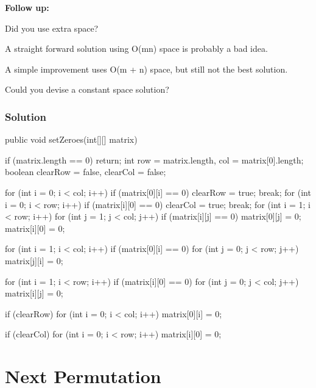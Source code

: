 \textbf{Follow up:}

Did you use extra space?

A straight forward solution using O(mn) space is probably a bad idea.

A simple improvement uses O(m + n) space, but still not the best solution.

Could you devise a constant space solution?

\newpage

\subsubsection{Solution}

\begin{Code}
public void setZeroes(int[][] matrix) {
    if (matrix.length == 0) {
        return;
    }
    int row = matrix.length, col = matrix[0].length;
    boolean clearRow = false, clearCol = false;

    for (int i = 0; i < col; i++) {
        if (matrix[0][i] == 0) {
            clearRow = true;
            break;
        }
    }
    for (int i = 0; i < row; i++) {
        if (matrix[i][0] == 0) {
            clearCol = true;
            break;
        }
    }
    for (int i = 1; i < row; i++) {
        for (int j = 1; j < col; j++) {
            if (matrix[i][j] == 0) {
                matrix[0][j] = 0;
                matrix[i][0] = 0;
            }
        }
    }

    for (int i = 1; i < col; i++) {
        if (matrix[0][i] == 0) {
            for (int j = 0; j < row; j++) {
                matrix[j][i] = 0;
            }
        }
    }

    for (int i = 1; i < row; i++) {
        if (matrix[i][0] == 0) {
            for (int j = 0; j < col; j++) {
                matrix[i][j] = 0;
            }
        }
    }

    if (clearRow) {
        for (int i = 0; i < col; i++) {
            matrix[0][i] = 0;
        }
    }

    if (clearCol) {
        for (int i = 0; i < row; i++) {
            matrix[i][0] = 0;
        }
    }
}
\end{Code}

\newpage

\section{Next Permutation} %

